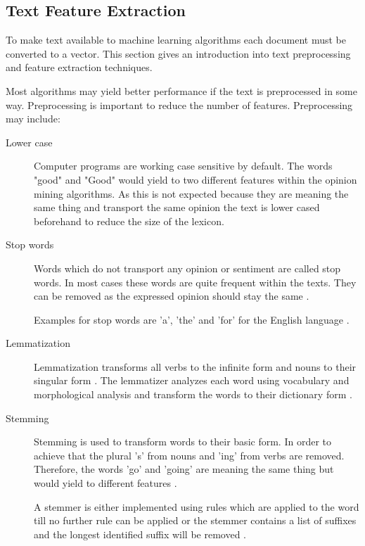 \subsection{Text Feature Extraction}
\label{ss:background-optionmining-textfeatureextraction}

To make text available to machine learning algorithms each document must be converted to a vector.
This section gives an introduction into text preprocessing and feature extraction techniques.

Most algorithms may yield better performance if the text is preprocessed in some way.
Preprocessing is important to reduce the number of features. Preprocessing may include:

\begin{description}
	\item [Lower case]
		Computer programs are working case sensitive by default.
		The words "good" and "Good" would yield to two different features within the opinion mining algorithms.
		As this is not expected because they are meaning the same thing and transport the same opinion the text is lower cased beforehand to reduce the size of the lexicon.

	\item [Stop words]
		Words which do not transport any opinion or sentiment are called stop words.
		In most cases these words are quite frequent within the texts.
		They can be removed as the expressed opinion should stay the same
		\citep{Nothman2018}.

		Examples for stop words are 'a', 'the' and 'for' for the English language
		\citep{schumaker2009textual}.

	\item [Lemmatization]
		Lemmatization transforms all verbs to the infinite form and nouns to their singular form 
		\citep{Shukri2015a}.
		The lemmatizer analyzes each word using vocabulary and morphological analysis and transform the words to their dictionary form
		\citep{Balakrishnan2014}.
 
	\item [Stemming]
		Stemming is used to transform words to their basic form.
		In order to achieve that the plural 's' from nouns and 'ing' from verbs are removed.
		Therefore, the words 'go' and 'going' are meaning the same thing but would yield to different features
		\citep{Shukri2015a}.

		A stemmer is either implemented using rules which are applied to the word till no further rule can be applied or the stemmer contains a list of suffixes and the longest identified suffix will be removed
		\citep{Balakrishnan2014}.
\end{description}


